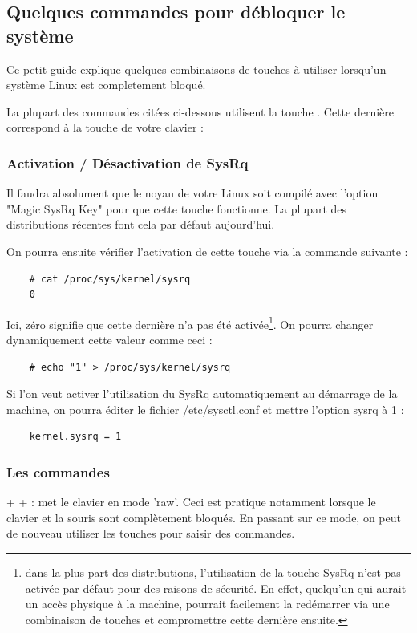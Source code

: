 \documentclass[a4paper,twoside]{article}
\begin{document}
\subsection{Quelques commandes pour débloquer le système}
Ce petit guide explique quelques combinaisons de touches à utiliser lorsqu'un système Linux est completement bloqué.


La plupart des commandes citées ci-dessous utilisent la touche . Cette dernière correspond à la touche  de votre clavier :

\subsubsection{Activation / Désactivation de SysRq}

Il faudra absolument que le noyau de votre Linux soit compilé avec l'option "Magic SysRq Key" pour que cette touche fonctionne. La plupart des distributions récentes font cela par défaut aujourd'hui.

On pourra ensuite vérifier l'activation de cette touche via la commande suivante :
\begin{verbatim}
    # cat /proc/sys/kernel/sysrq
    0
\end{verbatim}

Ici, zéro signifie que cette dernière n'a pas été activée\footnote{dans la plus part des distributions, l'utilisation de la touche SysRq n'est pas activée par défaut pour des raisons de sécurité. En effet, quelqu'un qui aurait un accès physique à la machine, pourrait facilement la redémarrer via une combinaison de touches et compromettre cette dernière ensuite.}. On pourra changer dynamiquement cette valeur comme ceci :
\begin{verbatim}
    # echo "1" > /proc/sys/kernel/sysrq
\end{verbatim}

Si l'on veut activer l'utilisation du SysRq automatiquement au démarrage de la machine, on pourra éditer le fichier /etc/sysctl.conf et mettre l'option sysrq à 1 :
\begin{verbatim}
    kernel.sysrq = 1
\end{verbatim}

\subsubsection{Les commandes}

 +  +  : met le clavier en mode 'raw'. Ceci est pratique notamment lorsque le clavier et la souris sont complètement bloqués. En passant sur ce mode, on peut de nouveau utiliser les touches pour saisir des commandes.
\end{document}
